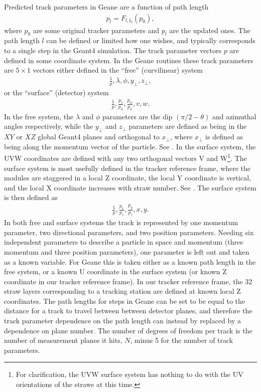 Predicted track parameters in Geane are a function of path length 
        \begin{align} \label{eq:pp}
            p_{l} = F_{l,l_{0}}(p_{0}),
        \end{align}
where $p_{0}$ are some original tracker parameters and $p_{l}$ are the updated ones. The path length $l$ can be defined or limited how one wishes, and typically corresponds to a single step in the Geant4 simulation. The track parameter vectors $p$ are defined in some coordinate system. In the Geane routines these track parameters are $5 \times 1$ vectors either defined in the ``free'' (curvilinear) system
        \begin{align}
            \frac{1}{p}, \lambda, \phi, y_{\perp}, z_{\perp},
        \end{align}
or the ``surface'' (detector) system 
        \begin{align} \label{eq:UVW}
            \frac{1}{p}, \frac{p_{v}}{p_{u}}, \frac{p_{w}}{p_{u}}, v, w.
        \end{align}
In the free system, the $\lambda$ and $\phi$ parameters are the dip $(\pi/2 - \theta)$ and azimuthal angles respectively, while the $y_{\perp}$ and $z_{\perp}$ parameters are defined as being in the $XY$ or $XZ$ global Geant4 planes and orthogonal to $x_{\perp}$, where $x_{\perp}$ is defined as being along the momentum vector of the particle. See . In the surface system, the UVW coordinates are defined with any two orthogonal vectors V and W\footnote{For clarification, the UVW surface system has nothing to do with the UV orientations of the straws at this time.}. The surface system is most usefully defined in the tracker reference frame, where the modules are staggered in a local Z coordinate, the local Y coordinate is vertical, and the local X coordinate increases with straw number. See . The surface system is then defined as
        \begin{align}
            \frac{1}{p}, \frac{p_{x}}{p_{z}}, \frac{p_{y}}{p_{z}}, x, y.
        \end{align}
In both free and surface systems the track is represented by one momentum parameter, two directional parameters, and two position parameters. Needing six independent parameters to describe a particle in space and momentum (three momentum and three position parameters), one parameter is left out and taken as a known variable. For Geane this is taken either as a known path length in the free system, or a known U coordinate in the surface system (or known Z coordinate in our tracker reference frame). In our tracker reference frame, the 32 straw layers corresponding to a tracking station are defined at known local Z coordinates. The path lengths for steps in Geane can be set to be equal to the distance for a track to travel between between detector planes, and therefore the track parameter dependence on the path length can instead by replaced by a dependence on plane number. The number of degrees of freedom per track is the number of measurement planes it hits, $N$, minus 5 for the number of track parameters.

